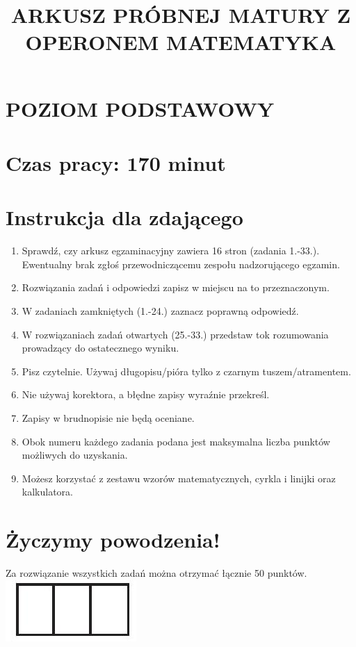\documentclass[10pt]{article}
\title{ARKUSZ PRÓBNEJ MATURY Z OPERONEM MATEMATYKA }
\author{}
\date{}
\begin{document}
\maketitle
\section*{POZIOM PODSTAWOWY}
\section*{Czas pracy: \(\mathbf{1 7 0}\) minut}
\section*{Instrukcja dla zdającego}
\begin{enumerate}
  \item Sprawdź, czy arkusz egzaminacyjny zawiera 16 stron (zadania 1.-33.). Ewentualny brak zgłoś przewodniczącemu zespołu nadzorującego egzamin.
  \item Rozwiązania zadań i odpowiedzi zapisz w miejscu na to przeznaczonym.
  \item W zadaniach zamkniętych (1.-24.) zaznacz poprawną odpowiedź.
  \item W rozwiązaniach zadań otwartych (25.-33.) przedstaw tok rozumowania prowadzący do ostatecznego wyniku.
  \item Pisz czytelnie. Używaj długopisu/pióra tylko z czarnym tuszem/atramentem.
  \item Nie używaj korektora, a błędne zapisy wyraźnie przekreśl.
  \item Zapisy w brudnopisie nie będą oceniane.
  \item Obok numeru każdego zadania podana jest maksymalna liczba punktów możliwych do uzyskania.
  \item Możesz korzystać z zestawu wzorów matematycznych, cyrkla i linijki oraz kalkulatora.
\end{enumerate}

\section*{Życzymy powodzenia!}
Za rozwiązanie wszystkich zadań można otrzymać łącznie 50 punktów.\\
\includegraphics[max width=\textwidth, center]{2024_11_21_769d5953f978b92e06f5g-01}
\end{document}
